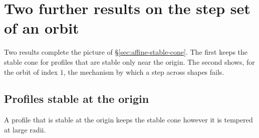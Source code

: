 
\section{Two further results on the step set of an orbit}\label{app:orbits}

Two results complete the picture of \S\ref{sec:affine-stable-cone}. The
first keeps the stable cone for profiles that are stable only near the origin. The second shows, for
the \Matern{} orbit of index $1$, the mechanism by which a step across shapes fails.

\subsection{Profiles stable at the origin}\label{app:tempered}

A profile that is stable at the origin keeps the stable cone however it is tempered at large radii.

